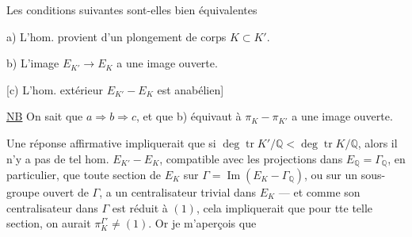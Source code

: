 Les conditions suivantes sont-elles bien équivalentes

a) L'hom. provient d'un plongement de corps $K\subset K'$.

b) L'image  $E_{K'}\longrightarrow E_K$ a une image ouverte.

[c) L'hom. extérieur $E_{K'}-E_K$ est anabélien]

\uline{NB} On sait que $a\Longrightarrow b\Longrightarrow c$, et que b) équivaut à $\pi_K-\pi_{K'}$ a une image ouverte.

Une réponse affirmative impliquerait que si $\deg\operatorname{tr}K'/\mathbb Q<\deg\operatorname{tr}K/\mathbb Q$, alors il n'y a pas de tel hom. $E_{K'}-E_K$, compatible avec les projections dans $E_{\mathbb Q}=\Gamma_{\mathbb Q}$, en particulier,   que  toute section de $E_K$ sur $\Gamma=\operatorname{Im}(E_K-\Gamma_{\mathbb Q})$, ou sur un sous-groupe ouvert  de $\Gamma$, a un centralisateur  trivial dans $E_K$ --- et comme son centralisateur dans $\Gamma$ est réduit à $(1)$, cela impliquerait que pour tte telle section, on aurait  $\pi_K^{\Gamma'}\ne(1)$. Or je m'aperçois que
